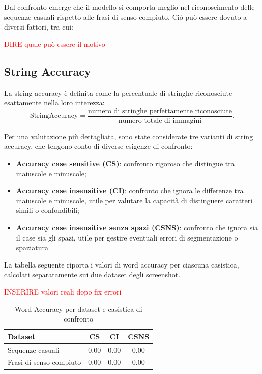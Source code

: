 Dal confronto emerge che il modello si comporta meglio nel riconoscimento delle sequenze casuali rispetto alle frasi di senso compiuto. Ciò può essere dovuto a diversi fattori, tra cui:

\textcolor{red}{DIRE quale può essere il motivo}

\subsection{String Accuracy}
La string accuracy è definita come la percentuale di stringhe riconosciute esattamente nella loro interezza:
\[
    \mathrm{StringAccuracy} = \frac{\text{numero di stringhe perfettamente riconosciute}}{\text{numero totale di immagini}}.
\]

Per una valutazione più dettagliata, sono state considerate tre varianti di string accuracy, che tengono conto di diverse esigenze di confronto:

\begin{itemize}
    \item \textbf{Accuracy case sensitive (CS)}: confronto rigoroso che distingue tra maiuscole e minuscole;
    \item \textbf{Accuracy case insensitive (CI)}: confronto che ignora le differenze tra maiuscole e minuscole, utile per valutare la capacità di distinguere caratteri simili o confondibili;
    \item \textbf{Accuracy case insensitive senza spazi (CSNS)}: confronto che ignora sia il case sia gli spazi, utile per gestire eventuali errori di segmentazione o spaziatura
\end{itemize}

La tabella seguente riporta i valori di word accuracy per ciascuna casistica, calcolati separatamente sui due dataset degli screenshot.

\textcolor{red}{INSERIRE valori reali dopo fix errori}

\begin{table}[htbp]
    \centering
    \begin{tabular}{lccc}
        \toprule
        Dataset & CS & CI & CSNS \\
        \midrule
        Sequenze casuali & 0.00 & 0.00 & 0.00 \\
        Frasi di senso compiuto & 0.00 & 0.00 & 0.00 \\
        \bottomrule
    \end{tabular}
    \caption{Word Accuracy per dataset e casistica di confronto}
    \label{tab:word_accuracy_stats}
\end{table}

